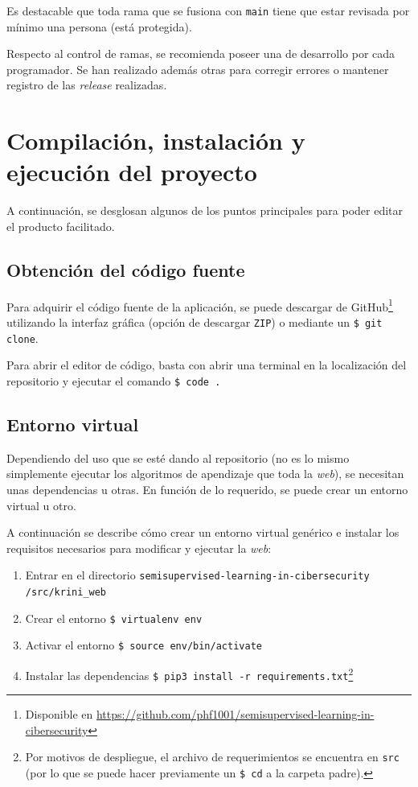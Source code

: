 \begin{itemize}
Es destacable que toda rama que se fusiona con \texttt{main} tiene que estar revisada por mínimo una persona (está protegida).

Respecto al control de ramas, se recomienda poseer una de desarrollo por cada programador. Se han realizado además otras para corregir errores o mantener registro de las \textit{release} realizadas.



\end{itemize}

\section{Compilación, instalación y ejecución del proyecto}
\label{s:inst-prog}

A continuación, se desglosan algunos de los puntos principales para poder editar el producto facilitado.

\subsection{Obtención del código fuente}

Para adquirir el código fuente de la aplicación, se puede descargar de GitHub\footnote{Disponible en \url{https://github.com/phf1001/semisupervised-learning-in-cibersecurity}} utilizando la interfaz gráfica (opción de descargar \texttt{ZIP}) o mediante un \texttt{\$ git clone}.

Para abrir el editor de código, basta con abrir una terminal en la localización del repositorio y ejecutar el comando \texttt{\$ code .}

\subsection{Entorno virtual}

Dependiendo del uso que se esté dando al repositorio (no es lo mismo simplemente ejecutar los algoritmos de apendizaje que toda la \textit{web}), se necesitan unas dependencias u otras. En función de lo requerido, se puede crear un entorno virtual u otro.

A continuación se describe cómo crear un entorno virtual genérico e instalar los requisitos necesarios para modificar y ejecutar la \textit{web}:

\begin{enumerate}
	\item Entrar en el directorio \texttt{semisupervised-learning-in-cibersecurity /src/krini\_web}
	\item Crear el entorno \texttt{\$ virtualenv env}
	\item Activar el entorno \texttt{\$ source  env/bin/activate}
	\item Instalar las dependencias \texttt{\$ pip3 install -r requirements.txt}\footnote{Por motivos de despliegue, el archivo de requerimientos se encuentra en \texttt{src} (por lo que se puede hacer previamente un \texttt{\$ cd} a la carpeta padre).}
\end{enumerate}

